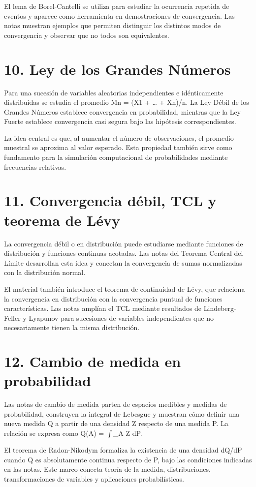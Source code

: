 \documentclass[11pt]{article}
\begin{document}
El lema de Borel-Cantelli se utiliza para estudiar la ocurrencia repetida de eventos y aparece como herramienta en demostraciones de convergencia. Las notas muestran ejemplos que permiten distinguir los distintos modos de convergencia y observar que no todos son equivalentes.


\section*{10. Ley de los Grandes Números}
Para una sucesión de variables aleatorias independientes e idénticamente distribuidas se estudia el promedio Mn = (X1 + \ldots{} + Xn)/n. La Ley Débil de los Grandes Números establece convergencia en probabilidad, mientras que la Ley Fuerte establece convergencia casi segura bajo las hipótesis correspondientes.

La idea central es que, al aumentar el número de observaciones, el promedio muestral se aproxima al valor esperado. Esta propiedad también sirve como fundamento para la simulación computacional de probabilidades mediante frecuencias relativas.


\section*{11. Convergencia débil, TCL y teorema de Lévy}
La convergencia débil o en distribución puede estudiarse mediante funciones de distribución y funciones continuas acotadas. Las notas del Teorema Central del Límite desarrollan esta idea y conectan la convergencia de sumas normalizadas con la distribución normal.

El material también introduce el teorema de continuidad de Lévy, que relaciona la convergencia en distribución con la convergencia puntual de funciones características. Las notas amplían el TCL mediante resultados de Lindeberg-Feller y Lyapunov para sucesiones de variables independientes que no necesariamente tienen la misma distribución.


\section*{12. Cambio de medida en probabilidad}
Las notas de cambio de medida parten de espacios medibles y medidas de probabilidad, construyen la integral de Lebesgue y muestran cómo definir una nueva medida Q a partir de una densidad Z respecto de una medida P. La relación se expresa como Q(A) = \(\int\)\_A Z dP.

El teorema de Radon-Nikodym formaliza la existencia de una densidad dQ/dP cuando Q es absolutamente continua respecto de P, bajo las condiciones indicadas en las notas. Este marco conecta teoría de la medida, distribuciones, transformaciones de variables y aplicaciones probabilísticas.
\end{document}
